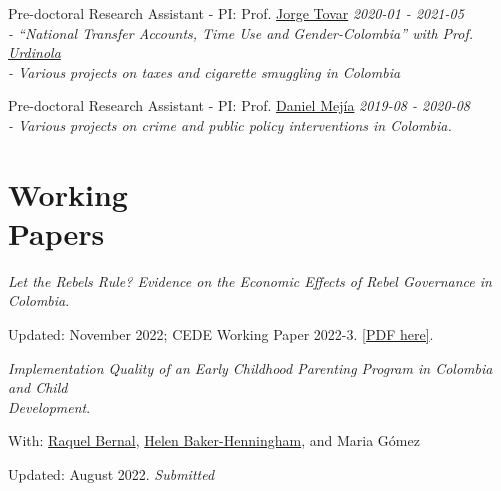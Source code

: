 \documentclass[margin,line]{res}
\newenvironment{list1}{
  \begin{list}{\ding{113}}{%
      \setlength{\itemsep}{0in}
      \setlength{\parsep}{0in} \setlength{\parskip}{0in}
      \setlength{\topsep}{0in} \setlength{\partopsep}{0in} 
      \setlength{\leftmargin}{0.17in}}}{\end{list}}
\begin{document}
\begin{resume}
\vspace{-.4cm}

{Pre-doctoral Research Assistant - PI: Prof. \href{https://sites.google.com/view/jorgetovar/home}{Jorge Tovar}} \hfill \emph{2020-01 - 2021-05} \\
{\em \footnotesize - ``National Transfer Accounts, Time Use and Gender-Colombia''  %
	with  Prof. \href{https://sites.google.com/site/piedadurdinola/}{Urdinola}}  \\
{\em \footnotesize - Various projects on taxes and cigarette smuggling in Colombia} 

\vspace{-.1cm}
{Pre-doctoral Research Assistant - PI: Prof. \href{https://sites.google.com/view/danielmejial}{Daniel Mejía}} \hfill \emph{2019-08 - 2020-08} \\
{\em \footnotesize - Various projects on crime and public policy interventions in Colombia.} 





\vspace{.1cm}

\section{\sc Working \\ Papers}

\textit{Let the Rebels Rule? Evidence on the Economic Effects of Rebel Governance in Colombia}.
\begin{list1}
    \item[] Updated: November 2022; CEDE Working Paper 2022-3. \href{https://papers.ssrn.com/sol3/papers.cfm?abstract_id=4020344}{[PDF here]}. 
\end{list1}


\textit{Implementation Quality of an Early Childhood Parenting Program in Colombia and Child \\ Development}.
\begin{list1}
    \item[] With: \href{https://sites.google.com/view/raquelbernal}{Raquel Bernal}, \href{https://research.bangor.ac.uk/portal/en/researchers/helen-henningham(ab5999a9-22af-4394-b4f4-89dff9971ad1).html}{Helen Baker-Henningham}, and Maria Gómez  
    \item[] Updated: August 2022. \emph{Submitted}
\end{list1}



\end{resume}
\end{document}

